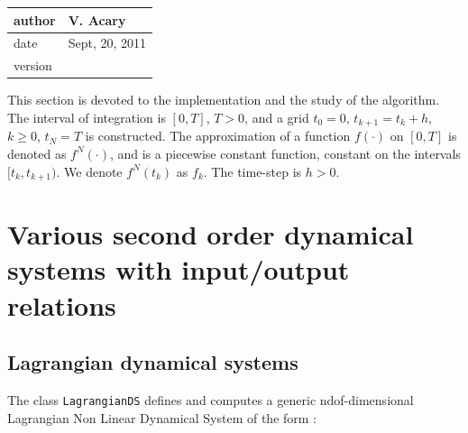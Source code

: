  \begin{table}[!ht]
  \begin{tabular}{|l|l|}
    \hline
    author  & V. Acary\\
    \hline
    date    & Sept, 20, 2011 \\
    \hline
    version &  \\
    \hline
  \end{tabular}
\end{table}



This section is devoted to the implementation and the study  of the algorithm. The interval of integration is $[0,T]$, $T>0$, and a grid $t_{0}=0$, $t_{k+1}=t_{k}+h$, $k \geq 0$, $t_{N}=T$ is constructed. The approximation of a function $f(\cdot)$ on $[0,T]$ is denoted as $f^{N}(\cdot)$, and is a piecewise constant function, constant on the intervals $[t_{k},t_{k+1})$. We denote $f^{N}(t_{k})$ as $f_{k}$. The time-step is $h>0$.


\section{Various second  order dynamical systems with input/output relations}



\subsection{Lagrangian dynamical systems}


The class {\tt LagrangianDS}  defines  and computes a generic ndof-dimensional
Lagrangian Non Linear Dynamical System of the form :

